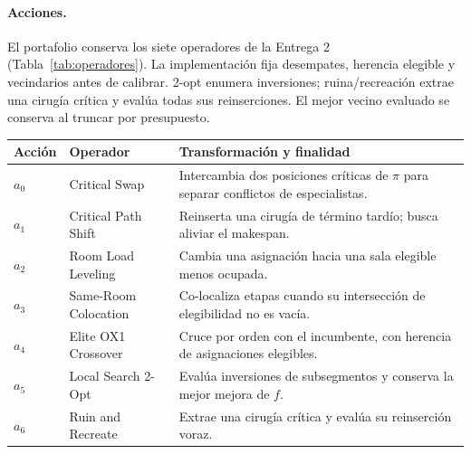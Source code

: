 \documentclass[11pt,a4paper]{article}
\begin{document}
\paragraph{Acciones.}
El portafolio conserva los siete operadores de la Entrega 2 (Tabla~\ref{tab:operadores}). La implementación fija desempates, herencia elegible y vecindarios antes de calibrar. 2-opt enumera inversiones; ruina/recreación extrae una cirugía crítica y evalúa todas sus reinserciones. El mejor vecino evaluado se conserva al truncar por presupuesto.
\begin{center}\small
\begin{tabularx}{\linewidth}{@{}l p{3.6cm} Y@{}}\toprule
Acción & Operador & Transformación y finalidad\\\midrule
$a_0$ & Critical Swap & Intercambia dos posiciones críticas de $\pi$ para separar conflictos de especialistas.\\
$a_1$ & Critical Path Shift & Reinserta una cirugía de término tardío; busca aliviar el makespan.\\
$a_2$ & Room Load Leveling & Cambia una asignación hacia una sala elegible menos ocupada.\\
$a_3$ & Same-Room Colocation & Co-localiza etapas cuando su intersección de elegibilidad no es vacía.\\
$a_4$ & Elite OX1 Crossover & Cruce por orden con el incumbente, con herencia de asignaciones elegibles.\\
$a_5$ & Local Search 2-Opt & Evalúa inversiones de subsegmentos y conserva la mejor mejora de $f$.\\
$a_6$ & Ruin and Recreate & Extrae una cirugía crítica y evalúa su reinserción voraz.\\\bottomrule
\end{tabularx}
\label{tab:operadores}
\end{center}
\end{document}
